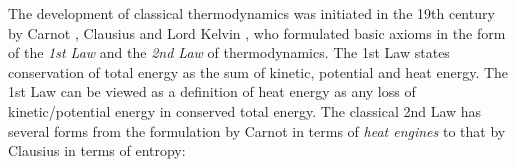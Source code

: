 The development of classical thermodynamics was initiated in 
the 19th century by Carnot \cite{carnot}, Clausius 
\cite{clausius1,clausius2} and Lord Kelvin \cite{kelvin}, who formulated
basic axioms in the form of the \emph{1st Law} and the \emph{2nd Law} of
thermodynamics. 
The 1st Law states conservation of total energy 
as the sum of kinetic, potential and heat energy. The 1st Law 
can be viewed as a definition of heat energy as
any loss of kinetic/potential energy in conserved total energy. 
The classical 2nd Law has several forms from the formulation
by Carnot in terms of \emph{heat engines} to that by Clausius
in terms of entropy:


